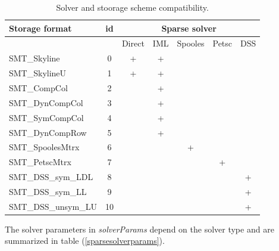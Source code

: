 \documentclass[a4paper]{article}
\newcommand{\param}[1]{{\em #1}}
\begin{document}
\begin{table}[h]                                                                
\begin{center}
\begin{tabular}{|l|c|c|c|c|c|c|}                                                      
\hline                                                                          
Storage format & id & \multicolumn{5}{c|}{Sparse solver} \\
\hline
 && \tiny{Direct} &\tiny{IML}
 &\tiny{Spooles}& \tiny{Petsc}& \tiny{DSS}\\
\hline
\small{SMT\_Skyline}       & 0&+&+& & & \\
\small{SMT\_SkylineU}      & 1&+&+& & & \\
\small{SMT\_CompCol}       & 2& &+& & & \\
\small{SMT\_DynCompCol}    & 3& &+& & & \\
\small{SMT\_SymCompCol}    & 4& &+& & & \\
\small{SMT\_DynCompRow}    & 5& &+& & & \\
\small{SMT\_SpoolesMtrx}   & 6& & &+& & \\
\small{SMT\_PetscMtrx }    & 7& & & &+& \\
\small{SMT\_DSS\_sym\_LDL} & 8& & & & &+\\
\small{SMT\_DSS\_sym\_LL}  & 9& & & & &+\\
\small{SMT\_DSS\_unsym\_LU}&10& & & & &+\\
\hline
\end{tabular}   
\caption{Solver and stoorage scheme compatibility.}                
\label{linsolvstoragecompattable}                                                         
\end{center}                                                                    
\end{table}                                                                     

The solver parameters in \param{solverParams} depend on the solver
type and are summarized in table (\ref{sparsesolverparams}).
\end{document}
